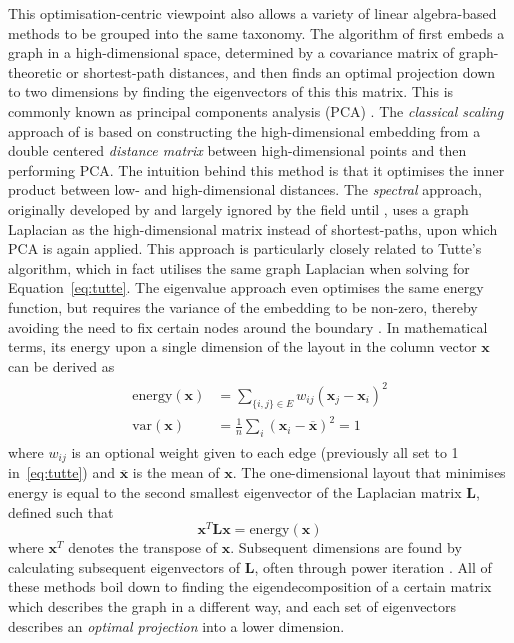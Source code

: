 This optimisation-centric viewpoint also allows a variety of linear algebra-based methods to be grouped into the same taxonomy.
The algorithm of \citet{Harel2004} first embeds a graph in a high-dimensional space, determined by a covariance matrix of graph-theoretic or shortest-path distances, and then finds an optimal projection down to two dimensions by finding the eigenvectors of this this matrix. This is commonly known as principal components analysis (PCA) \citep{Pearson1901}.
The \emph{classical scaling} approach of \citet{Brandes2007Eigensolver} is based on constructing the high-dimensional embedding from a double centered \emph{distance matrix} between high-dimensional points and then performing PCA. The intuition behind this method is that it optimises the inner product between low- and high-dimensional distances.
The \emph{spectral} approach, originally developed by \citet{Hall1970} and largely ignored by the field until \citet{Koren2003}, uses a graph Laplacian as the high-dimensional matrix instead of shortest-paths, upon which PCA is again applied. This approach is particularly closely related to Tutte's algorithm, which in fact utilises the same graph Laplacian when solving for Equation~\eqref{eq:tutte}.
The eigenvalue approach even optimises the same energy function, but requires the variance of the embedding to be non-zero, thereby avoiding the need to fix certain nodes around the boundary \citep{Koren2003}.
In mathematical terms, its energy upon a single dimension of the layout in the column vector $\mathbf{x}$ can be derived as
\begin{align}
\begin{split}
  \mathrm{energy}(\mathbf{x}) &= \sum_{\{i,j\}\in E}w_{ij}(\mathbf{x}_j-\mathbf{x}_i)^2\\
  \mathrm{var}(\mathbf{x}) &= \frac{1}{n}\sum_i(\mathbf{x}_i-\overline{\mathbf{x}})^2 = 1
\end{split}
\label{eq:spectral}
\end{align}
where $w_{ij}$ is an optional weight given to each edge (previously all set to 1 in~\eqref{eq:tutte}) and $\overline{\mathbf{x}}$ is the mean of $\mathbf{x}$. The one-dimensional layout that minimises energy is equal to the second smallest eigenvector of the Laplacian matrix $\mathbf{L}$, defined such that
\begin{equation}
  \mathbf{x}^T\mathbf{Lx} = \mathrm{energy}(\mathbf{x})
  \label{eq:spectral_laplacian}
\end{equation}
where $\mathbf{x}^T$ denotes the transpose of $\mathbf{x}$. Subsequent dimensions are found by calculating subsequent eigenvectors of $\mathbf{L}$, often through power iteration \citep{Koren2003}.
All of these methods boil down to finding the eigendecomposition of a certain matrix which describes the graph in a different way, and each set of eigenvectors describes an \emph{optimal projection} into a lower dimension.


